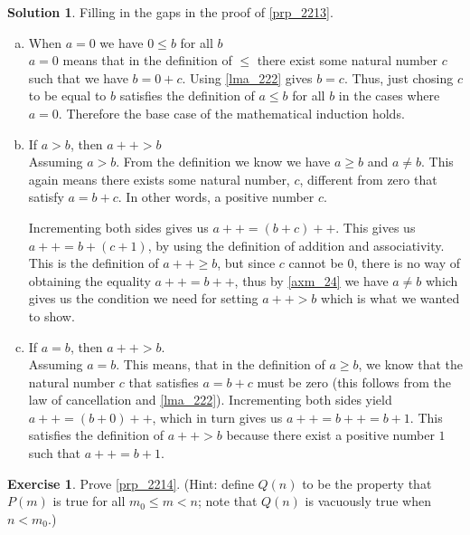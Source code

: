 \documentclass[a4paper, twocolumn]{report}
\newcounter{exercise} \numberwithin{exercise}{section}
\theoremstyle{definition}
\newtheorem{exc}[exercise]{Exercise}
\theoremstyle{solution}
\newtheorem*{sltn}{Solution}
\newcommand{\dplus}{{+}{+}} %
\begin{document}
\begin{sltn}
  Filling in the gaps in the proof of \ref{prp_2213}.
  \begin{enumerate}[(a)]
    \item When $a = 0$ we have $0 \leq b$ for all $b$\\
      [0.2cm]
      $a = 0$ means that in the definition of $\leq$ there exist some natural
      number $c$ such that we have $b = 0 + c$.  Using \ref{lma_222} gives $b =
      c$. Thus, just chosing $c$ to be equal to $b$ satisfies the definition of
      $a \leq b$ for all $b$ in the cases where $a = 0$. Therefore the base
      case of the mathematical induction holds.

    \item If $a > b$, then $a\dplus > b$\\
      [0.2cm]
      Assuming $a > b$. From the definition we know we have $a \geq b$ and $a
      \neq b$.  This again means there exists some natural number, $c$,
      different from zero that satisfy $a = b + c$. In other words, a positive
      number $c$.

      Incrementing both sides gives us $a\dplus = (b + c)\dplus$. This gives us
      $a\dplus = b + (c + 1)$, by using the definition of addition and
      associativity. This is the definition of $a\dplus \geq b$, but since $c$
      cannot be $0$, there is no way of obtaining the equality $a\dplus =
      b\dplus$, thus by \ref{axm_24} we have $a \neq b$ which gives us the
      condition we need for setting $a \dplus > b$ which is what we wanted to
      show.

    \item If $a = b$, then $a\dplus > b$.\\
      [0.2cm]
      Assuming $a = b$. This means, that in the definition of $a \geq b$, we
      know that the natural number $c$ that satisfies $a = b + c$ must be zero
      (this follows from the law of cancellation and \ref{lma_222}).
      Incrementing both sides yield $a\dplus = (b+0)\dplus$, which in turn
      gives us $a\dplus = b\dplus = b + 1$.  This satisfies the definition of
      $a\dplus > b$ because there exist a positive number $1$ such that
      $a\dplus = b + 1$.
  \end{enumerate}
\end{sltn}

\begin{exc}
  Prove \ref{prp_2214}. (Hint: define $Q(n)$ to be the property that $P(m)$ is
    true for all $m_0 \leq m < n$; note that $Q(n)$ is vacuously true when $n <
  m_0$.)
\end{exc}
\end{document}
